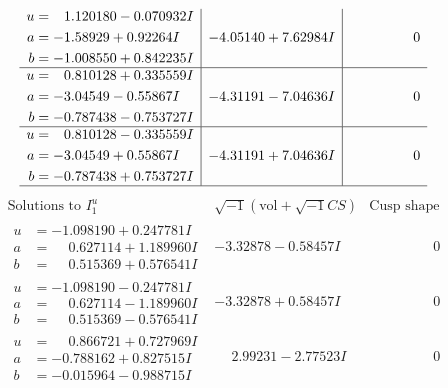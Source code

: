 \documentclass[1p]{elsarticle_modified}
\theoremstyle{definition}
\newcommand{\I}{\sqrt{-1}}
\begin{document}
$$\begin{array}{c|c|c}
\begin{aligned}
u &= \phantom{-}1.120180 - 0.070932 I \\
a &= -1.58929 + 0.92264 I \\
b &= -1.008550 + 0.842235 I\end{aligned}
 & -4.05140 + 7.62984 I & \phantom{-0.000000 } 0 \\ \hline\begin{aligned}
u &= \phantom{-}0.810128 + 0.335559 I \\
a &= -3.04549 - 0.55867 I \\
b &= -0.787438 - 0.753727 I\end{aligned}
 & -4.31191 - 7.04636 I & \phantom{-0.000000 } 0 \\ \hline\begin{aligned}
u &= \phantom{-}0.810128 - 0.335559 I \\
a &= -3.04549 + 0.55867 I \\
b &= -0.787438 + 0.753727 I\end{aligned}
 & -4.31191 + 7.04636 I & \phantom{-0.000000 } 0\\
 \hline 
 \end{array}$$\newpage$$\begin{array}{c|c|c}  
\text{Solutions to }I^u_{1}& \I (\text{vol} + \sqrt{-1}CS) & \text{Cusp shape}\\
 \hline 
\begin{aligned}
u &= -1.098190 + 0.247781 I \\
a &= \phantom{-}0.627114 + 1.189960 I \\
b &= \phantom{-}0.515369 + 0.576541 I\end{aligned}
 & -3.32878 - 0.58457 I & \phantom{-0.000000 } 0 \\ \hline\begin{aligned}
u &= -1.098190 - 0.247781 I \\
a &= \phantom{-}0.627114 - 1.189960 I \\
b &= \phantom{-}0.515369 - 0.576541 I\end{aligned}
 & -3.32878 + 0.58457 I & \phantom{-0.000000 } 0 \\ \hline\begin{aligned}
u &= \phantom{-}0.866721 + 0.727969 I \\
a &= -0.788162 + 0.827515 I \\
b &= -0.015964 - 0.988715 I\end{aligned}
 & \phantom{-}2.99231 - 2.77523 I & \phantom{-0.000000 } 0 \\ \hline\begin{aligned}

\end{aligned}
\end{array}$$
\end{document}
